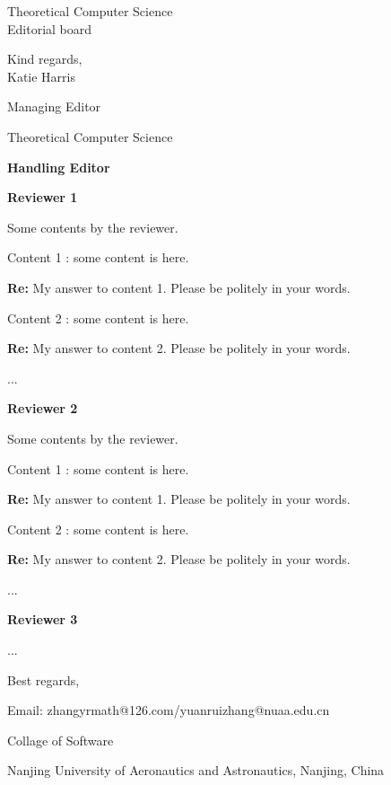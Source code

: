 \documentclass[a4paper,10pt]{letter}
\newcommand{\review}[1]{\hrulefill\par{\Large\textbf{Reviewer #1}}}
\newcommand{\editor}[1]{\hrulefill\par{\Large\textbf{#1}}}
\newcommand{\ranswer}[1]{{\color{blue}\textnormal{\textbf{Re:}} #1}}
\newcommand{\raddress}[1]{{\noindent \setlength{\parskip}{0.1em} \linespread{0.25} #1}}
\begin{document}
\begin{letter}{Theoretical Computer Science\\
    Editorial board}
\vspace{1cm}

Kind regards,
\\

Katie Harris

Managing Editor

Theoretical Computer Science




\editor{Handling Editor}



\review{1}

Some contents by the reviewer.

Content 1 : some content is here.

\ranswer{
    My answer to content 1. Please be politely in your words.
}

Content 2 : some content is here.

\ranswer{
    My answer to content 2. Please be politely in your words.
}

...




\review{2}

Some contents by the reviewer.

Content 1 : some content is here.

\ranswer{
    My answer to content 1. Please be politely in your words.
}

Content 2 : some content is here.

\ranswer{
    My answer to content 2. Please be politely in your words.
}

...

\review{3}

...


\hrulefill
\vspace{.4in}

\closing{Best regards,}


%

\raddress{

Email: zhangyrmath@126.com/yuanruizhang@nuaa.edu.cn

Collage of Software

Nanjing University of Aeronautics and Astronautics, Nanjing, China
}


\end{letter}
\end{document}
